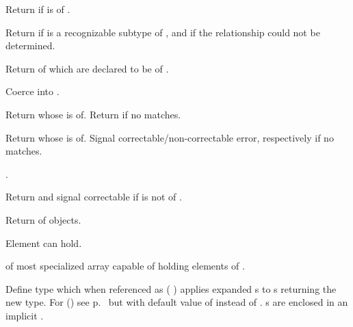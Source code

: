\begin{LIST}{1cm}

  {
  Return \retval{\T} if  is of .
  }

  {
  Return \retval{\T} if  is a recognizable subtype of
  , and \retvalii{\NIL} if the relationship could not be
  determined. 
  }

  {
  Return  of  which are declared to be of
  . 
  }

  {
  Coerce  into .
  }

  {
  Return  whose  is
   of. Return  if no
   matches.
  }

  {
  Return  whose  is
   of. Signal correctable/non-correctable error, respectively
  if no  matches.
  }

  {
  .
  }

  {
  Return \retval{\NIL} and signal correctable  if  is
  not of . 
  }

  {
  Return  of  objects.
  }

  {
  Element   can hold.
  }

  {
   of most specialized array capable of holding
  elements of . 
  }

  {
  Define type  which when referenced as (
  ) applies expanded s to s
  returning the new type. For () see
  p.~\pageref{section:Macros} but with default value of \kwd{\A}
  instead of \NIL. s are enclosed in an implicit  .
  }


\end{LIST}
